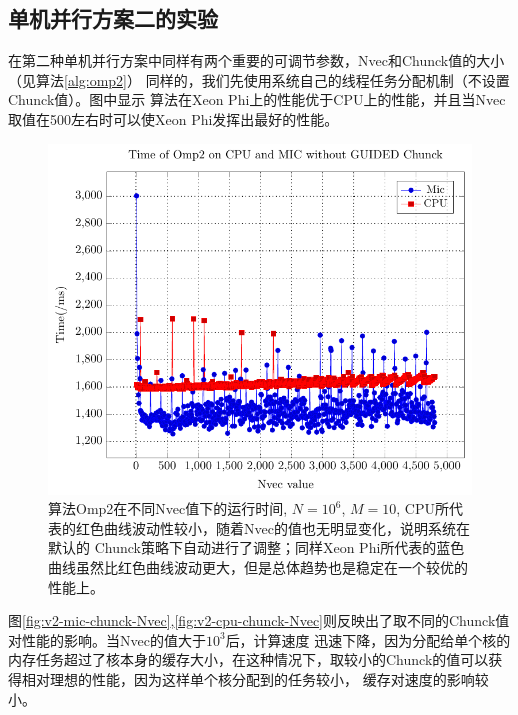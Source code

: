 \subsection{单机并行方案二的实验} %
\label{sub:bsV2}
在第二种单机并行方案中同样有两个重要的可调节参数，Nvec和Chunck值的大小（见算法\ref{alg:omp2}）
同样的，我们先使用系统自己的线程任务分配机制（不设置Chunck值）。图\label{fig:v2-Nvec}中显示
算法在Xeon Phi上的性能优于CPU上的性能，并且当Nvec取值在500左右时可以使Xeon Phi发挥出最好的性能。
\begin{figure}[!t]
   \centering
   \includegraphics[width=\textwidth]{chap5/Figures/bsV2-6-mic-cpu-Time-Chunck-0.pdf}
   \caption{算法Omp2在不同Nvec值下的运行时间, $N=10^6$, $M=10$, CPU所代表的红色曲线波动性较小，随着Nvec的值也无明显变化，说明系统在默认的
   Chunck策略下自动进行了调整；同样Xeon Phi所代表的蓝色曲线虽然比红色曲线波动更大，但是总体趋势也是稳定在一个较优的性能上。}
   \label{fig:v2-Nvec}
\end{figure}
图\ref{fig:v2-mic-chunck-Nvec},\ref{fig:v2-cpu-chunck-Nvec}则反映出了取不同的Chunck值对性能的影响。当Nvec的值大于$10^3$后，计算速度
迅速下降，因为分配给单个核的内存任务超过了核本身的缓存大小，在这种情况下，取较小的Chunck的值可以获得相对理想的性能，因为这样单个核分配到的任务较小，
缓存对速度的影响较小。

